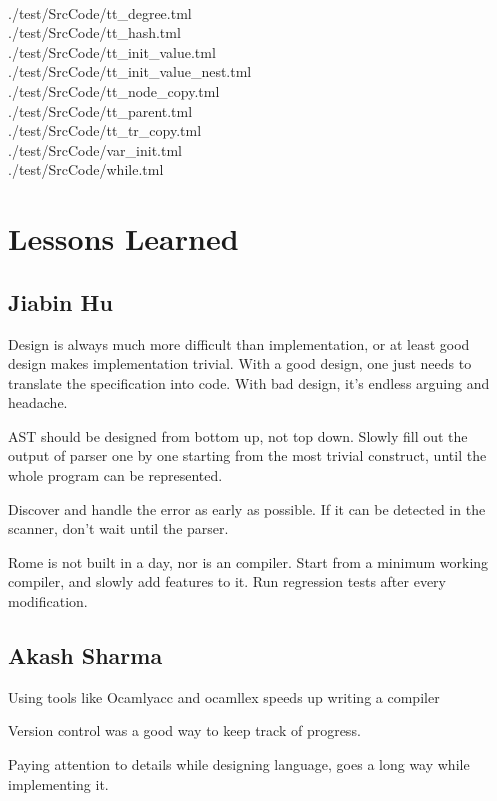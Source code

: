\documentclass[12pt,psfig,a4]{article}
\begin{document}
\begin{code}
\begin{tabbing}
\\ \> ./test/SrcCode/tt\_degree.tml
\\ \> ./test/SrcCode/tt\_hash.tml
\\ \> ./test/SrcCode/tt\_init\_value.tml
\\ \> ./test/SrcCode/tt\_init\_value\_nest.tml
\\ \> ./test/SrcCode/tt\_node\_copy.tml
\\ \> ./test/SrcCode/tt\_parent.tml
\\ \> ./test/SrcCode/tt\_tr\_copy.tml
\\ \> ./test/SrcCode/var\_init.tml
\\ \> ./test/SrcCode/while.tml
\end{tabbing}
\end{code}

\pagebreak
\section{Lessons Learned}
\subsection{Jiabin Hu}
Design is always much more difficult than implementation, or at least good design makes implementation trivial. With a good design, one just needs to translate the specification into code. With bad design, it's endless arguing and headache.

AST should be designed from bottom up, not top down. Slowly fill out the output of parser one by one starting from the most trivial construct, until the whole program can be represented.

Discover and handle the error as early as possible. If it can be detected in the scanner, don't wait until the parser.

Rome is not built in a day, nor is an compiler. Start from a minimum working compiler, and slowly add features to it. Run regression tests after every modification.

\subsection{Akash Sharma}

Using tools like Ocamlyacc and ocamllex speeds up writing a compiler

Version control was a good way to keep track of progress.

Paying attention to details while designing language, goes a long way while implementing it.
\end{document}
